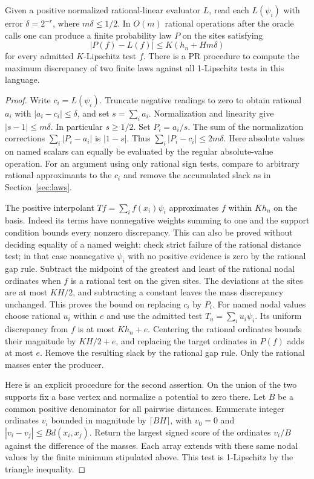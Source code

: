 \begin{theorem}
Given a positive normalized rational-linear evaluator $L$, read each
$L(\psi_i)$ with error $\delta=2^{-r}$, where $m\delta\le1/2$.
In $O(m)$ rational operations after the oracle calls one can produce a
finite probability law $P$ on the sites satisfying
\[
             |P(f)-L(f)|\le K(h_n+Hm\delta)
\]
for every admitted $K$-Lipschitz test $f$. There is a PR procedure to compute
the maximum discrepancy of two finite laws against all 1-Lipschitz tests
in this language.
\end{theorem}
\begin{proof}
Write $c_i=L(\psi_i)$. Truncate negative readings to zero to obtain rational
$a_i$ with $|a_i-c_i|\le\delta$, and set $s=\sum_i a_i$.
Normalization and linearity give $|s-1|\le m\delta$. In particular
$s\ge1/2$. Set $P_i=a_i/s$. The sum of the normalization corrections
$\sum_i|P_i-a_i|$ is $|1-s|$. Thus $\sum_i|P_i-c_i|\le2m\delta$.
Here absolute values on named scalars can equally be evaluated by the regular
absolute-value operation. For an argument using only rational sign tests,
compare to arbitrary rational approximants to the $c_i$ and remove the
accumulated slack as in Section~\ref{sec:laws}.

The positive interpolant $Tf=\sum_i f(x_i)\psi_i$ approximates $f$ within
$Kh_n$ on the basis. Indeed its terms have nonnegative weights summing to
one and the support condition bounds every nonzero discrepancy. This can also
be proved without deciding equality of a named weight: check strict failure
of the rational distance test; in that case nonnegative $\psi_i$ with no
positive evidence is zero by the rational gap rule. Subtract the midpoint of
the greatest and least of the rational nodal ordinates when $f$ is a rational
test on the given sites. The deviations at the sites are at most $KH/2$,
and subtracting a constant leaves the mass discrepancy unchanged. This
proves the bound on replacing $c_i$ by $P_i$. For named nodal values choose rational $u_i$ within $e$ and use the admitted test $T_u=\sum_i u_i\psi_i$. Its uniform discrepancy from $f$ is at most $Kh_n+e$. Centering the rational ordinates bounds their magnitude by $KH/2+e$, and replacing the target ordinates in $P(f)$ adds at most $e$. Remove the resulting slack by the rational gap rule. Only the rational masses enter the producer.

Here is an explicit procedure for the second assertion. On the union of the
two supports fix a base vertex and normalize a potential to zero there.
Let $B$ be a common positive denominator for all pairwise distances. Enumerate
integer ordinates $v_i$ bounded in magnitude by $\lceil BH\rceil$, with
$v_0=0$ and $|v_i-v_j|\le B d(x_i,x_j)$. Return the largest signed score
of the ordinates $v_i/B$ against the difference of the masses. Each array
extends with these same nodal values by the finite minimum stipulated above.
This test is 1-Lipschitz by the triangle inequality.


\end{proof}

